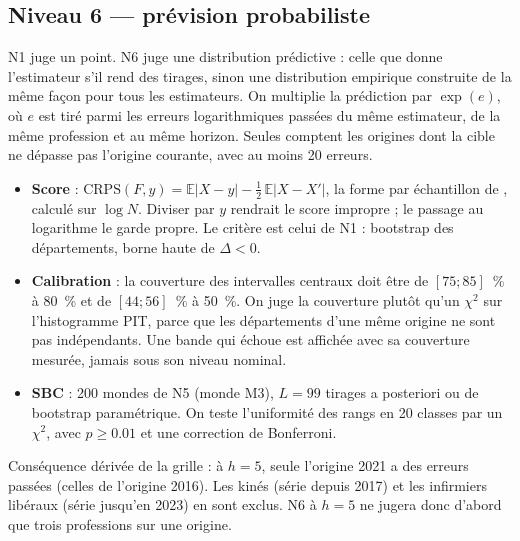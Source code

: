 \subsection{Niveau 6 --- prévision probabiliste}
N1 juge un point. N6 juge une distribution prédictive : celle que donne l'estimateur s'il rend des
tirages, sinon une distribution empirique construite de la même façon pour tous les estimateurs.
On multiplie la prédiction par $\exp(e)$, où $e$ est tiré parmi les erreurs logarithmiques passées
du même estimateur, de la même profession et au même horizon. Seules comptent les origines dont la
cible ne dépasse pas l'origine courante, avec au moins 20\suppose{} erreurs.
\begin{itemize}
  \item \textbf{Score} : $\mathrm{CRPS}(F, y) = \mathbb{E}|X - y| - \tfrac12\,\mathbb{E}|X - X'|$,
        la forme par échantillon de \citet[éq.~21, au signe près]{a3-gneiting2007jasa}, calculé sur
        $\log N$. Diviser par $y$ rendrait le score impropre ; le passage au logarithme le garde
        propre. Le critère est celui de N1 : bootstrap des départements, borne haute de $\Delta < 0$.
  \item \textbf{Calibration} : la couverture des intervalles centraux doit être de
        $[75 ; 85]$\suppose{}~\% à 80~\% et de $[44 ; 56]$\suppose{}~\% à 50~\%. On juge la
        couverture plutôt qu'un $\chi^2$ sur l'histogramme PIT, parce que les départements d'une
        même origine ne sont pas indépendants. Une bande qui échoue est affichée avec sa couverture
        mesurée, jamais sous son niveau nominal.
  \item \textbf{SBC} : 200 mondes de N5 (monde M3), $L = 99$ tirages a posteriori ou de bootstrap
        paramétrique. On teste l'uniformité des rangs en 20 classes par un $\chi^2$, avec
        $p \ge \num{0.01}$\suppose{} et une correction de Bonferroni.
\end{itemize}
Conséquence dérivée de la grille : à $h = 5$, seule l'origine 2021 a des erreurs passées (celles de
l'origine 2016). Les kinés (série depuis 2017) et les infirmiers libéraux (série jusqu'en 2023) en
sont exclus\derive{}. N6 à $h = 5$ ne jugera donc d'abord que trois professions sur une origine.

